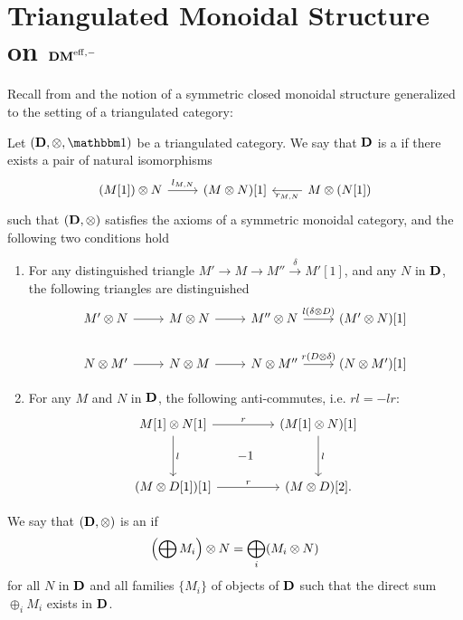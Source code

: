 \section{Triangulated Monoidal Structure on $\DMeff$}
\label{sect_TMS_DMeff}

Recall from \cite[1.13]{MK} and \cite[8A.1]{MVW} the notion of a 
symmetric closed monoidal structure generalized to the setting of 
a triangulated category:

\begin{defn}\label{def_tensor_triang_cat}
Let $(\DCat, \tensor, \Unit)$ be a triangulated category. We say that $\DCat$ 
is a  if there exists a pair of
natural isomorphisms 
\[
\begin{tikzcd}
(M[1]) \tensor N \arrow{r}{l_{M, N}}&
(M \tensor N)[1] &
M \tensor (N[1]) \arrow{l}{r_{M, N}}
\end{tikzcd}
\]
such that $(\DCat[D], \tensor)$ satisfies the axioms of a 
symmetric monoidal category, and the following two conditions
hold
\begin{enumerate}
\item For any distinguished triangle $M' \to M \to M'' 
\stackrel{\delta}{\to} M'[1]$, and any $N$ in $\DCat[D]$,
the following triangles are distinguished
\[
\begin{tikzcd}
M' \tensor N \arrow{r} &
M \tensor N \arrow{r} &
M'' \tensor N \arrow{r}{l(\delta \tensor D)}&
(M' \tensor N)[1] \\
N \tensor M' \arrow{r} &
N \tensor M \arrow{r} &
N \tensor M'' \arrow{r}{r(D \tensor \delta)}&
(N \tensor M')[1]
\end{tikzcd}
\]

\item For any $M$ and $N$ in $\DCat[D]$, the following 
anti-commutes, i.e. $rl = -lr$:
\[
\begin{tikzcd}[row sep=small, column sep=small]
M[1] \tensor N[1] \arrow{rr}{r}\arrow{dd}{l} && 
(M[1] \tensor N)[1] \arrow{dd}{l} \\
& -1 \\
(M \tensor D[1])[1] \arrow{rr}{r} &&
(M \tensor D)[2].
\end{tikzcd}
\]
\end{enumerate}

We say that $(\DCat, \tensor)$ is an  if 
\[
\left(\bigoplus M_i\right) \tensor N = \bigoplus_i (M_i \tensor N)
\]
for all $N$ in $\DCat$ and all families $\{M_i\}$ of objects of 
$\DCat$ such that the direct sum $\oplus_i M_i$ exists in $\DCat$. 
\end{defn}

